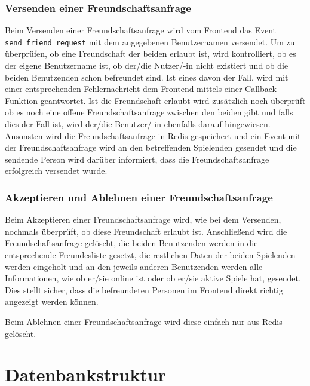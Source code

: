 \subsubsection{Versenden einer Freundschaftsanfrage}
Beim Versenden einer Freundschaftsanfrage wird vom Frontend das Event \linebreak \verb|send_friend_request| mit dem angegebenen Benutzernamen versendet. Um zu \linebreak überprüfen, ob eine Freundschaft der beiden erlaubt ist, wird kontrolliert, ob es der eigene Benutzername ist, ob der/die Nutzer/-in nicht existiert und ob die beiden Benutzenden schon befreundet sind. Ist eines davon der Fall, wird mit einer entsprechenden Fehlernachricht dem Frontend mittels einer Callback-Funktion geantwortet. 
Ist die Freundschaft erlaubt wird zusätzlich noch überprüft ob es noch eine offene Freundschaftsanfrage zwischen den beiden gibt und falls dies der Fall ist, wird der/die Benutzer/-in ebenfalls darauf hingewiesen.
Ansonsten wird die Freundschaftsanfrage in Redis gespeichert und ein Event mit der Freundschaftsanfrage wird an den betreffenden Spielenden gesendet und die sendende Person wird darüber informiert, dass die Freundschaftsanfrage erfolgreich versendet wurde.

\subsubsection{Akzeptieren und Ablehnen einer Freundschaftsanfrage}
\label{sec:accept-friend-request}
Beim Akzeptieren einer Freundschaftsanfrage wird, wie bei dem Versenden, nochmals überprüft, ob diese Freundschaft erlaubt ist. Anschließend wird die Freundschaftsanfrage gelöscht, die beiden Benutzenden werden in die entsprechende Freundesliste gesetzt, die restlichen Daten der beiden Spielenden werden eingeholt und an den jeweils anderen Benutzenden werden alle Informationen, wie ob er/sie online ist oder ob er/sie aktive Spiele hat, gesendet. Dies stellt sicher, dass die befreundeten Personen im Frontend direkt richtig angezeigt werden können.

Beim Ablehnen einer Freundschaftsanfrage wird diese einfach nur aus Redis gelöscht.
		\section{Datenbankstruktur}
